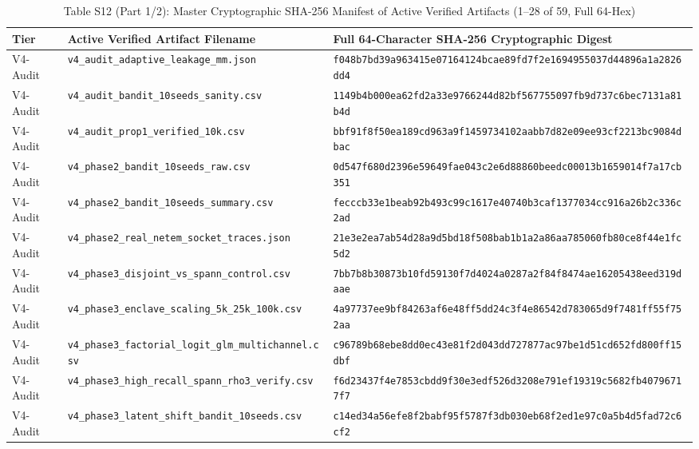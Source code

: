 \documentclass[10pt,journal,compsoc]{IEEEtran}
\begin{document}
\begin{table}[!t]
\centering
\caption{Table S12 (Part 1/2): Master Cryptographic SHA-256 Manifest of Active Verified Artifacts (1--28 of 59, Full 64-Hex)}
\setlength{\tabcolsep}{4.5pt}
\renewcommand{\arraystretch}{1.02}
\begin{adjustbox}{max width=\textwidth}
\begin{tabular}{@{}lll@{}}
\toprule
\textbf{Tier} & \textbf{Active Verified Artifact Filename} & \textbf{Full 64-Character SHA-256 Cryptographic Digest} \\
\midrule
V4-Audit & \texttt{v4\_audit\_adaptive\_leakage\_mm.json} & \texttt{\scriptsize f048b7bd39a963415e07164124bcae89fd7f2e1694955037d44896a1a2826dd4} \\
V4-Audit & \texttt{v4\_audit\_bandit\_10seeds\_sanity.csv} & \texttt{\scriptsize 1149b4b000ea62fd2a33e9766244d82bf567755097fb9d737c6bec7131a81b4d} \\
V4-Audit & \texttt{v4\_audit\_prop1\_verified\_10k.csv} & \texttt{\scriptsize bbf91f8f50ea189cd963a9f1459734102aabb7d82e09ee93cf2213bc9084dbac} \\
V4-Audit & \texttt{v4\_phase2\_bandit\_10seeds\_raw.csv} & \texttt{\scriptsize 0d547f680d2396e59649fae043c2e6d88860beedc00013b1659014f7a17cb351} \\
V4-Audit & \texttt{v4\_phase2\_bandit\_10seeds\_summary.csv} & \texttt{\scriptsize fecccb33e1beab92b493c99c1617e40740b3caf1377034cc916a26b2c336c2ad} \\
V4-Audit & \texttt{v4\_phase2\_real\_netem\_socket\_traces.json} & \texttt{\scriptsize 21e3e2ea7ab54d28a9d5bd18f508bab1b1a2a86aa785060fb80ce8f44e1fc5d2} \\
V4-Audit & \texttt{v4\_phase3\_disjoint\_vs\_spann\_control.csv} & \texttt{\scriptsize 7bb7b8b30873b10fd59130f7d4024a0287a2f84f8474ae16205438eed319daae} \\
V4-Audit & \texttt{v4\_phase3\_enclave\_scaling\_5k\_25k\_100k.csv} & \texttt{\scriptsize 4a97737ee9bf84263af6e48ff5dd24c3f4e86542d783065d9f7481ff55f752aa} \\
V4-Audit & \texttt{v4\_phase3\_factorial\_logit\_glm\_multichannel.csv} & \texttt{\scriptsize c96789b68ebe8dd0ec43e81f2d043dd727877ac97be1d51cd652fd800ff15dbf} \\
V4-Audit & \texttt{v4\_phase3\_high\_recall\_spann\_rho3\_verify.csv} & \texttt{\scriptsize f6d23437f4e7853cbdd9f30e3edf526d3208e791ef19319c5682fb40796717f7} \\
V4-Audit & \texttt{v4\_phase3\_latent\_shift\_bandit\_10seeds.csv} & \texttt{\scriptsize c14ed34a56efe8f2babf95f5787f3db030eb68f2ed1e97c0a5b4d5fad72c6cf2} \\

\end{tabular}
\end{adjustbox}
\end{table}
\end{document}
